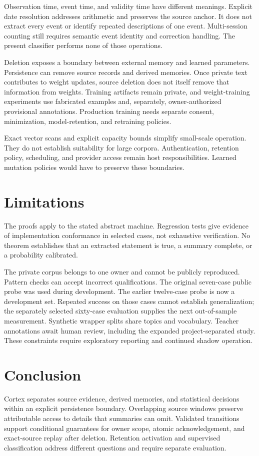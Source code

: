 \documentclass[11pt]{article}
\begin{document}
Observation time, event time, and validity time have different meanings. Explicit date resolution addresses arithmetic and preserves the source anchor. It does not extract every event or identify repeated descriptions of one event. Multi-session counting still requires semantic event identity and correction handling. The present classifier performs none of those operations.

Deletion exposes a boundary between external memory and learned parameters. Persistence can remove source records and derived memories. Once private text contributes to weight updates, source deletion does not itself remove that information from weights. Training artifacts remain private, and weight-training experiments use fabricated examples and, separately, owner-authorized provisional annotations. Production training needs separate consent, minimization, model-retention, and retraining policies.

Exact vector scans and explicit capacity bounds simplify small-scale operation. They do not establish suitability for large corpora. Authentication, retention policy, scheduling, and provider access remain host responsibilities. Learned mutation policies would have to preserve these boundaries.

\section{Limitations}
The proofs apply to the stated abstract machine. Regression tests give evidence of implementation conformance in selected cases, not exhaustive verification. No theorem establishes that an extracted statement is true, a summary complete, or a probability calibrated.

The private corpus belongs to one owner and cannot be publicly reproduced. Pattern checks can accept incorrect qualifications. The original seven-case public probe was used during development. The earlier twelve-case probe is now a development set. Repeated success on those cases cannot establish generalization; the separately selected sixty-case evaluation supplies the next out-of-sample measurement. Synthetic wrapper splits share topics and vocabulary. Teacher annotations await human review, including the expanded project-separated study. These constraints require exploratory reporting and continued shadow operation.

\section{Conclusion}
Cortex separates source evidence, derived memories, and statistical decisions within an explicit persistence boundary. Overlapping source windows preserve attributable access to details that summaries can omit. Validated transitions support conditional guarantees for owner scope, atomic acknowledgement, and exact-source replay after deletion. Retention activation and supervised classification address different questions and require separate evaluation.
\end{document}
